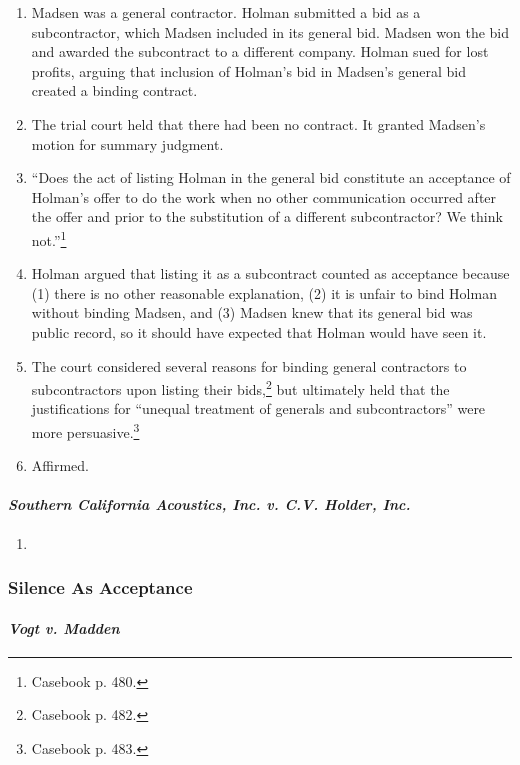 \begin{enumerate}
    \item Madsen was a general contractor. Holman submitted a bid as a 
    subcontractor, which Madsen included in its general bid. Madsen won the 
    bid and awarded the subcontract to a different company. Holman sued for 
    lost profits, arguing that inclusion of Holman's bid in Madsen's general 
    bid created a binding contract.
    \item The trial court held that there had been no contract. It granted 
    Madsen's motion for summary judgment.
    \item ``Does the act of listing Holman in the general bid constitute an 
    acceptance of Holman's offer to do the work when no other communication 
    occurred after the offer and prior to the substitution of a different 
    subcontractor? We think not.''\footnote{Casebook p. 480.}
    \item Holman argued that listing it as a subcontract counted as acceptance 
    because (1) there is no other reasonable explanation, (2) it is unfair to 
    bind Holman without binding Madsen, and (3) Madsen knew that its general 
    bid was public record, so it should have expected that Holman would have 
    seen it.
    \item The court considered several reasons for binding general contractors 
    to subcontractors upon listing their bids,\footnote{Casebook p. 482.} but 
    ultimately held that the justifications for ``unequal treatment of 
    generals and subcontractors'' were more persuasive.\footnote{Casebook p. 
    483.}
    \item Affirmed.
\end{enumerate}

\paragraph{\emph{Southern California Acoustics, Inc. v. C.V. Holder, Inc.}}

\begin{enumerate}
    \item %
\end{enumerate}

\subsubsection{Silence As Acceptance}

\paragraph{\emph{Vogt v. Madden}}

